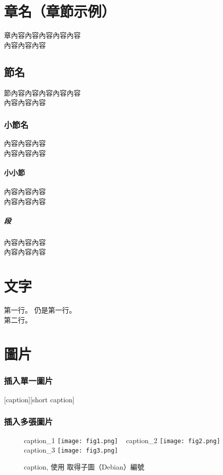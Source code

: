 \documentclass[class=NCU_thesis, crop=false]{standalone}
\begin{document}
\chapter{章名（章節示例）}
章內容內容內容內容內容 \\
內容內容內容

\section{節名}
節內容內容內容內容內容 \\
內容內容內容

\subsection{小節名}
內容內容內容 \\
內容內容內容

\subsubsection{小小節}
內容內容內容 \\
內容內容內容

\paragraph{段}
內容內容內容 \\
內容內容內容

\chapter{文字}
第一行。
仍是第一行。 \\
第二行。


\chapter{圖片}
\subsection{插入單一圖片}
[caption][short caption]

\subsection{插入多張圖片}
\begin{figure}[!hbt]
    \centering
    \subcaptionbox
        {caption\_1
        \label{fig:subfig_fig1}}
        {\texttt{[image: fig1.png]}}
    ~
    \subcaptionbox
        {caption\_2
        \label{fig:subfig_fig2}}
        {\texttt{[image: fig2.png]}}
    \vspace{\baselineskip} %
    \subcaptionbox
        {caption\_3
        \label{fig:subfig_fig3}}
        {\texttt{[image: fig3.png]}}
    \caption{caption, 使用 取得子圖（Debian）編號 }
    \label{fig:labal}
\end{figure}
\end{document}
